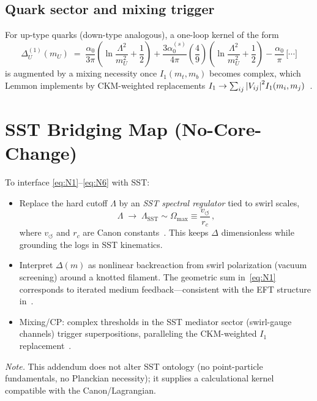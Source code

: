 \documentclass[11pt]{article}
\begin{document}
      \subsection{Quark sector and mixing trigger}
          For up-type quarks (down-type analogous), a one-loop kernel of the form
          \begin{equation}
          \Delta^{(1)}_U(m_U)\;=\;\frac{\alpha_0}{3\pi}\!\left(\ln\frac{\Lambda^2}{m_U^2}+\frac12\right)
          +\frac{3\alpha_0^{(s)}}{4\pi}\!\left(\frac{4}{9}\right)\!\left(\ln\frac{\Lambda^2}{m_U^2}+\frac12\right)
          -\frac{\alpha_0}{\pi}\,\Big[\cdots\Big]
          \label{eq:N6}
          \end{equation}
          is augmented by a mixing necessity once $I_1(m_t,m_b)$ becomes complex, which Lemmon implements by CKM-weighted replacements $I_1\to\sum_{ij}\abs{V_{ij}}^2 I_1(m_i,m_j)$~\cite{Lemmon2013FamiliesAlpha}.

      \section{SST Bridging Map (No-Core-Change)}
      To interface \cref{eq:N1}--\cref{eq:N6} with SST:
      \begin{itemize}
      \item Replace the hard cutoff $\Lambda$ by an \emph{SST spectral regulator} tied to swirl scales,
      \[
          \Lambda \;\longrightarrow\; \Lambda_{\text{SST}} \sim \Omega_{\max} \equiv \frac{v_{\circlearrowleft}}{r_c}\,,
      \]
      where $v_{\circlearrowleft}$ and $r_c$ are Canon constants~\cite{SSTCanon2025}. This keeps $\Delta$ dimensionless while grounding the logs in SST kinematics.
      \item Interpret $\Delta(m)$ as nonlinear backreaction from swirl polarization (vacuum screening) around a knotted filament. The geometric sum in~\cref{eq:N1} corresponds to iterated medium feedback---consistent with the EFT structure in~\cite{SSTLagrangian2025}.
      \item Mixing/CP: complex thresholds in the SST mediator sector (swirl-gauge channels) trigger superpositions, paralleling the CKM-weighted $I_1$ replacement~\cite{Lemmon2013FamiliesAlpha}.
      \end{itemize}
      \emph{Note.} This addendum does not alter SST ontology (no point-particle fundamentals, no Planckian necessity); it supplies a calculational kernel compatible with the Canon/Lagrangian.
\end{document}
